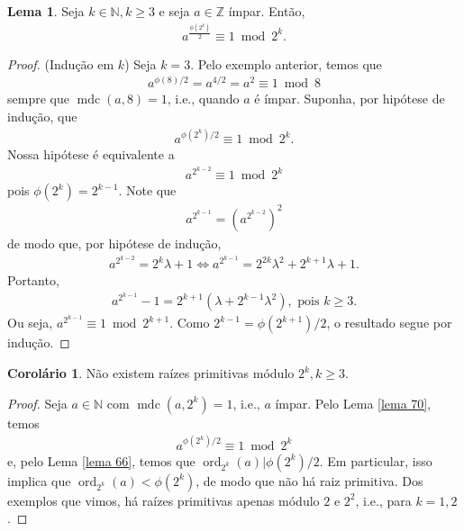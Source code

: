 \documentclass[a4paper,11pt,twoside, leqno]{article}
\DeclareMathOperator{\mdc}{mdc}
\DeclareMathOperator{\Ord}{ord}
\theoremstyle{definition}
\newtheorem{corollary}{Corolário}[theorem]
\newtheorem{lemma}[theorem]{Lema}
\begin{document}
\begin{lemma}
	\label{lema 70}
	Seja $k\in\mathbb{N}, k\geq 3$ e seja $a\in\mathbb{Z}$ ímpar. Então,
	\begin{align*}
	a^{\frac{\phi(2^k)}{2}}\equiv 1\bmod 2^k.
	\end{align*} 
\end{lemma}
\begin{proof}
	(Indução em $k$) Seja $k=3$. Pelo exemplo anterior, temos que
	\begin{align*}
	a^{\phi(8)/2} = a^{4/2} = a^2\equiv 1\bmod 8
	\end{align*}
	sempre que $\mdc(a,8) = 1$, i.e., quando $a$ é ímpar. Suponha, por hipótese de indução, que
	\begin{align*}
	a^{\phi(2^k)/2}\equiv 1\bmod 2^k.
	\end{align*} 
	Nossa hipótese é equivalente a 
	\begin{align*}
	a^{2^{k-2}}\equiv 1\bmod 2^k
	\end{align*}
	pois $\phi(2^k)=2^{k-1}$. Note que 
	\begin{align*}
	a^{2^{k-1}} = \left( a^{2^{k-2}} \right)^2
	\end{align*}
	de modo que, por hipótese de indução,
	\begin{align*}
	a^{2^{k-2}} = 2^k\lambda + 1 \Leftrightarrow a^{2^{k-1}} = 2^{2k}\lambda^2 + 2^{k+1}\lambda + 1.
	\end{align*}
	Portanto, 
	\begin{align*}
	a^{2^{k-1}}-1 = 2^{k+1}\left( \lambda + 2^{k-1}\lambda^2 \right), \text{ pois } k\geq 3.
	\end{align*}
	Ou seja, $a^{2^{k-1}}\equiv 1\bmod 2^{k+1}$. Como $2^{k-1} = \phi(2^{k+1})/2$, o resultado segue por indução.
\end{proof}
\begin{corollary}
	Não existem raízes primitivas módulo $2^k, k\geq 3$.
\end{corollary}
\begin{proof}
	Seja $a\in\mathbb{N}$ com $\mdc(a,2^k) = 1$, i.e., $a$ ímpar. Pelo Lema \eqref{lema 70}, temos
	\begin{align*}
	a^{\phi(2^k)/2}\equiv 1\bmod 2^k
	\end{align*}
	e, pelo Lema \eqref{lema 66}, temos que $\Ord_{2^k}(a)|\phi(2^k)/2$. Em particular, isso implica que $\Ord_{2^k}(a)<\phi(2^k)$, de modo que não há raiz primitiva. Dos exemplos que vimos, há raízes primitivas apenas módulo $2$ e $2^2$, i.e., para $k=1,2$.
\end{proof}
\end{document}

